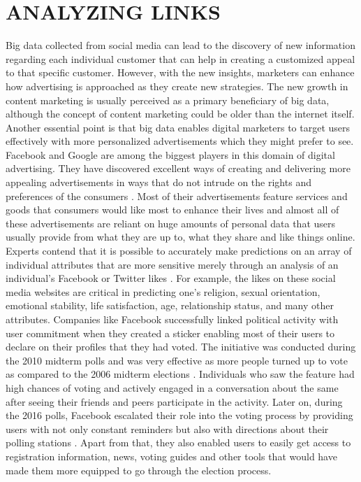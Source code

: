 \documentclass[sigconf]{acmart}
\begin{document}
\section{ANALYZING LINKS}

Big data collected from social media can lead to the discovery of new information regarding each individual customer that can help in creating a customized appeal to that specific customer. However, with the new insights, marketers can enhance how advertising is approached as they create new strategies. The new growth in content marketing is usually perceived as a primary beneficiary of big data, although the concept of content marketing could be older than the internet itself. \\
Another essential point is that big data enables digital marketers to target users effectively with more personalized advertisements which they might prefer to see. Facebook and Google are among the biggest players in this domain of digital advertising. They have discovered excellent ways of creating and delivering more appealing advertisements in ways that do not intrude on the rights and preferences of the consumers  \cite{MangoldandFaulds2009}. Most of their advertisements feature services and goods that consumers would like most to enhance their lives and almost all of these advertisements are reliant on huge amounts of personal data that users usually provide from what they are up to, what they share and like things online.  \\
Experts contend that it is possible to accurately make predictions on an array of individual attributes that are more sensitive merely through an analysis of an individual’s Facebook or Twitter likes \cite{Nate2014}. For example, the likes on these social media websites are critical in predicting one’s religion, sexual orientation, emotional stability, life satisfaction, age, relationship status, and many other attributes. Companies like Facebook successfully linked political activity with user commitment when they created a sticker enabling most of their users to declare on their profiles that they had voted. The initiative was conducted during the 2010 midterm polls and was very effective as more people turned up to vote as compared to the 2006 midterm elections \cite{Lind2014}. Individuals who saw the feature had high chances of voting and actively engaged in a conversation about the same after seeing their friends and peers participate in the activity. Later on, during the 2016 polls, Facebook escalated their role into the voting process by providing users with not only constant reminders but also with directions about their polling stations \cite{Perez2016}. Apart from that, they also enabled users to easily get access to registration information, news, voting guides and other tools that would have made them more equipped to go through the election process.
\end{document}
